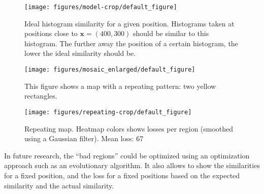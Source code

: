 \begin{figure}[h!]
\begin{center}
\texttt{[image: figures/model-crop/default\_figure]}
\caption{{\label{fig:model} Ideal
    histogram similarity for a given position. Histograms taken at
    positions close to $\textbf{x} = (400, 300)$ should be similar to
    this histogram. The further away the position of a certain
    histogram, the lower the ideal similarity should be.%
}}
\end{center}
\end{figure}

\begin{figure}[h!]
\begin{center}
\texttt{[image: figures/mosaic\_enlarged/default\_figure]}
\caption{{\label{fig:map} This figure shows a map with a repeating pattern: two
    yellow rectangles.%
}}
\end{center}
\end{figure}

\begin{figure}[h!]
\begin{center}
\texttt{[image: figures/repeating-crop/default\_figure]}
\caption{{\label{fig:repeating} Repeating map. Heatmap colors shows losses per region
    (smoothed using a Gaussian filter). Mean loss: 67%
}}
\end{center}
\end{figure}

In future research, the ``bad regions'' could be optimized using an
optimization approach such as an evolutionary algorithm. It also
allows to show the similarities for a fixed position, and the loss for
a fixed positions based on the expected similarity and the actual
similarity.